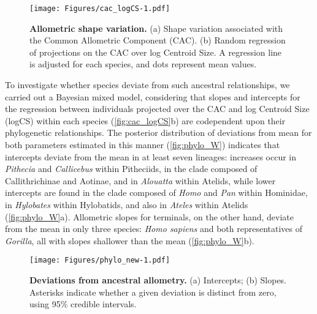 \documentclass[12pt,twoside]{report}
\begin{document}
\begin{figure}[htbp]
\centering
\texttt{[image: Figures/cac\_logCS-1.pdf]}
\caption{\textbf{Allometric shape variation.} (a) Shape variation
associated with the Common Allometric Component (CAC). (b) Random
regression of projections on the CAC over log Centroid Size. A
regression line is adjusted for each species, and dots represent mean
values. \label{fig:cac_logCS}}
\end{figure}

To investigate whether species deviate from such ancestral
relationships, we carried out a Bayesian mixed model, considering that
slopes and intercepts for the regression between individuals projected
over the CAC and log Centroid Size (logCS) within each species
(\autoref{fig:cac_logCS}b) are codependent upon their phylogenetic
relationships. The posterior distribution of deviations from mean for
both parameters estimated in this manner (\autoref{fig:phylo_W})
indicates that intercepts deviate from the mean in at least seven
lineages: increases occur in \emph{Pithecia} and \emph{Callicebus}
within Pitheciids, in the clade composed of Callithrichinae and Aotinae,
and in \emph{Alouatta} within Atelids, while lower intercepts are found
in the clade composed of \emph{Homo} and \emph{Pan} within Hominidae, in
\emph{Hylobates} within Hylobatids, and also in \emph{Ateles} within
Atelids (\autoref{fig:phylo_W}a). Allometric slopes for terminals, on
the other hand, deviate from the mean in only three species: \emph{Homo
sapiens} and both representatives of \emph{Gorilla}, all with slopes
shallower than the mean (\autoref{fig:phylo_W}b).

\begin{figure}[htbp]
\centering
\texttt{[image: Figures/phylo\_new-1.pdf]}
\caption{\textbf{Deviations from ancestral allometry.} (a) Intercepts;
(b) Slopes. Asterisks indicate whether a given deviation is distinct
from zero, using 95\% credible intervals. \label{fig:phylo_W}}
\end{figure}
\end{document}
